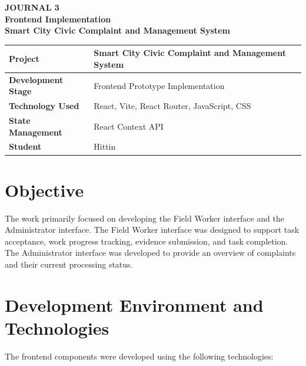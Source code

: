 \documentclass[12pt,a4paper]{article}
\begin{document}

\begin{center}
    {\Large \textbf{JOURNAL 3}}\\[8pt]
    {\large \textbf{Frontend Implementation}}\\[6pt]
    {\normalsize \textbf{Smart City Civic Complaint and Management System}}
\end{center}

\vspace{12pt}

\begin{tabular}{|p{}|p{}|}
\hline
\textbf{Project} &
Smart City Civic Complaint and Management System \\ \hline

\textbf{Development Stage} &
Frontend Prototype Implementation \\ \hline

\textbf{Technology Used} &
React, Vite, React Router, JavaScript, CSS \\ \hline

\textbf{State Management} &
React Context API \\ \hline


\textbf{Student} &
Hittin \\ \hline
\end{tabular}

\section{Objective}

The work primarily focused on developing the Field Worker interface and the
Administrator interface. The Field Worker interface was designed to support
task acceptance, work progress tracking, evidence submission, and task
completion. The Administrator interface was developed to provide an overview
of complaints and their current processing status.

\section{Development Environment and Technologies}

The frontend components were developed using the following technologies:
\end{document}
